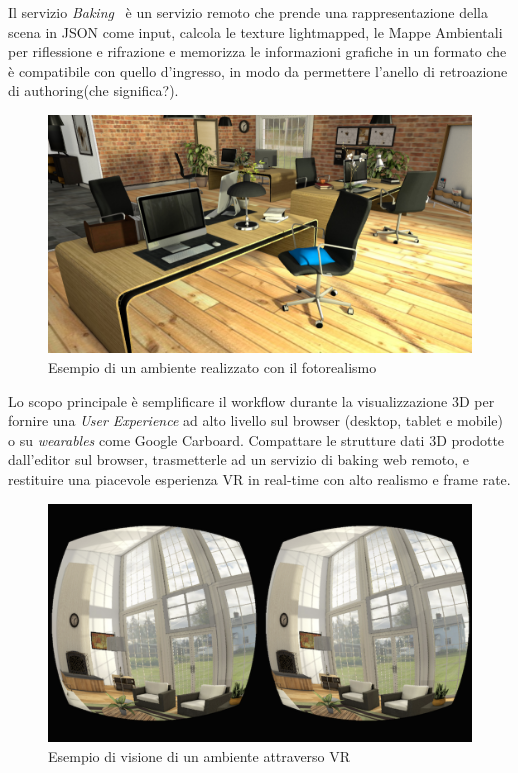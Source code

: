 Il servizio \emph{Baking}~\cite{baking} \`e un servizio remoto che prende una rappresentazione della scena in JSON come input,
calcola le texture lightmapped, le Mappe Ambientali per riflessione e rifrazione e memorizza le informazioni grafiche
in un formato che \`e compatibile con quello d'ingresso, in modo da permettere l'anello di retroazione di authoring(che significa?).\\

\begin{figure}[htbp] %
   \centering
   \includegraphics[width=1\linewidth]{images/explorer-a-1}
   \caption{Esempio di un ambiente realizzato con il fotorealismo}
   \label{fig:revit}
   \end{figure}

Lo scopo principale \`e semplificare il workflow durante la visualizzazione 3D per fornire una \emph{User Experience}
ad alto livello sul browser (desktop, tablet e mobile) o su \emph{wearables} come Google Carboard.
Compattare le strutture dati 3D prodotte dall'editor sul browser, trasmetterle ad un servizio di baking web remoto,
e restituire una piacevole esperienza VR in real-time con alto realismo e frame rate.

\begin{figure}[htbp] %
   \centering
   \includegraphics[width=1\linewidth]{images/vr}
   \caption{Esempio di visione di un ambiente attraverso VR}
   \label{fig:revit}
   \end{figure}

